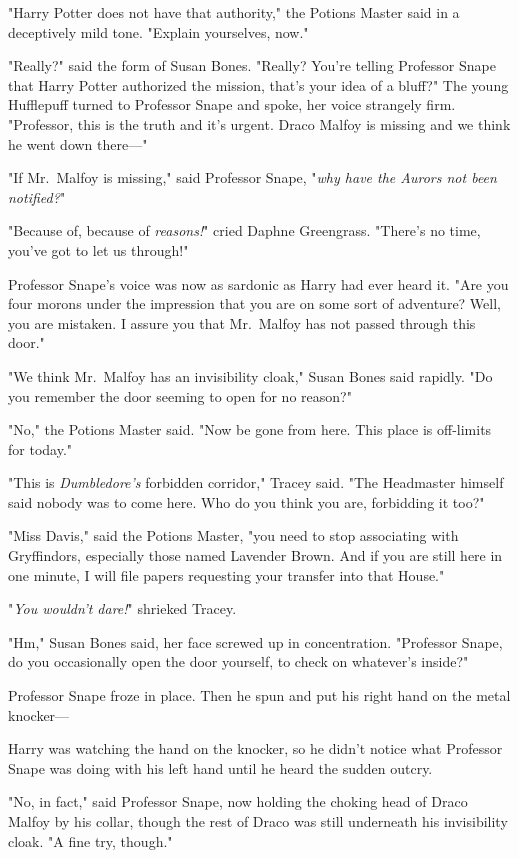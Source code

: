 "Harry Potter does not have that authority," the Potions Master said in a
deceptively mild tone. "Explain yourselves, now."

"Really?" said the form of Susan Bones. "Really? You're telling Professor Snape
that Harry Potter authorized the mission, that's your idea of a bluff?" The
young Hufflepuff turned to Professor Snape and spoke, her voice strangely firm.
"Professor, this is the truth and it's urgent. Draco Malfoy is missing and we
think he went down there—"

"If Mr.~Malfoy is missing," said Professor Snape, "\emph{why have the Aurors
not been notified?}"

"Because of, because of \emph{reasons!}" cried Daphne Greengrass. "There's no
time, you've got to let us through!"

Professor Snape's voice was now as sardonic as Harry had ever heard it. "Are
you four morons under the impression that you are on some sort of adventure?
Well, you are mistaken. I assure you that Mr.~Malfoy has not passed through
this door."

"We think Mr.~Malfoy has an invisibility cloak," Susan Bones said rapidly. "Do
you remember the door seeming to open for no reason?"

"No," the Potions Master said. "Now be gone from here. This place is off-limits
for today."

"This is \emph{Dumbledore's} forbidden corridor," Tracey said. "The Headmaster
himself said nobody was to come here. Who do you think you are, forbidding it
too?"

"Miss Davis," said the Potions Master, "you need to stop associating with
Gryffindors, especially those named Lavender Brown. And if you are still here
in one minute, I will file papers requesting your transfer into that House."

"\emph{You wouldn't dare!}" shrieked Tracey.

"Hm," Susan Bones said, her face screwed up in concentration. "Professor Snape,
do you occasionally open the door yourself, to check on whatever's inside?"

Professor Snape froze in place. Then he spun and put his right hand on the
metal knocker—

Harry was watching the hand on the knocker, so he didn't notice what Professor
Snape was doing with his left hand until he heard the sudden outcry.

"No, in fact," said Professor Snape, now holding the choking head of Draco
Malfoy by his collar, though the rest of Draco was still underneath his
invisibility cloak. "A fine try, though."

